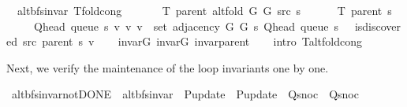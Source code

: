 \begin{isabellebody}
\isamarkupfalse%
\ {\isacharparenleft}{\kern0pt}\ alt{\isacharunderscore}{\kern0pt}bfs{\isacharunderscore}{\kern0pt}invar{\isacharparenright}{\kern0pt}\ T{\isacharunderscore}{\kern0pt}fold{\isacharunderscore}{\kern0pt}cong{\isacharcolon}{\kern0pt}\isanewline
\ \ \isanewline
\ \ \ \ {\isachardoublequoteopen}T\ {\isacharparenleft}{\kern0pt}parent\ {\isacharparenleft}{\kern0pt}alt{\isacharunderscore}{\kern0pt}fold\ G{}\ G{}\ src\ s{\isacharparenright}{\kern0pt}{\isacharparenright}{\kern0pt}\ {\isacharequal}{\kern0pt}\isanewline
\ \ \ \ \ T\ {\isacharparenleft}{\kern0pt}parent\ s{\isacharparenright}{\kern0pt}\ {\isasymunion}\isanewline
\ \ \ \ \ {\isacharbraceleft}{\kern0pt}{\isacharparenleft}{\kern0pt}Q{\isacharunderscore}{\kern0pt}head\ {\isacharparenleft}{\kern0pt}queue\ s{\isacharparenright}{\kern0pt}{\isacharcomma}{\kern0pt}\ v{\isacharparenright}{\kern0pt}\ {\isacharbar}{\kern0pt}v{\isachardot}{\kern0pt}\ v\ {\isasymin}\ set\ {\isacharparenleft}{\kern0pt}adjacency\ G{}\ G{}\ s\ {\isacharparenleft}{\kern0pt}Q{\isacharunderscore}{\kern0pt}head\ {\isacharparenleft}{\kern0pt}queue\ s{\isacharparenright}{\kern0pt}{\isacharparenright}{\kern0pt}{\isacharparenright}{\kern0pt}\ {\isasymand}\ {\isasymnot}\ is{\isacharunderscore}{\kern0pt}discovered\ src\ {\isacharparenleft}{\kern0pt}parent\ s{\isacharparenright}{\kern0pt}\ v{\isacharbraceright}{\kern0pt}{\isachardoublequoteclose}\isanewline
%
\isadelimproof
\ \ %
\endisadelimproof
%
\isatagproof
{}\isamarkupfalse%
\ invar{\isacharunderscore}{\kern0pt}G{}\ invar{\isacharunderscore}{\kern0pt}G{}\ invar{\isacharunderscore}{\kern0pt}parent\isanewline
\ \ \isamarkupfalse%
\ {\isacharparenleft}{\kern0pt}intro\ T{\isacharunderscore}{\kern0pt}alt{\isacharunderscore}{\kern0pt}fold{\isacharunderscore}{\kern0pt}cong{\isacharparenright}{\kern0pt}%
\endisatagproof
{\isafoldproof}%
%
\isadelimproof
%
\endisadelimproof
%
\begin{isamarkuptext}%
Next, we verify the maintenance of the loop invariants one by one.%
\end{isamarkuptext}\isamarkuptrue%
\isamarkupfalse%
\ alt{\isacharunderscore}{\kern0pt}bfs{\isacharunderscore}{\kern0pt}invar{\isacharunderscore}{\kern0pt}not{\isacharunderscore}{\kern0pt}DONE\ {\isacharequal}{\kern0pt}\ alt{\isacharunderscore}{\kern0pt}bfs{\isacharunderscore}{\kern0pt}invar\ \ P{\isacharunderscore}{\kern0pt}update\ {\isacharequal}{\kern0pt}\ P{\isacharunderscore}{\kern0pt}update\ \ Q{\isacharunderscore}{\kern0pt}snoc\ {\isacharequal}{\kern0pt}\ Q{\isacharunderscore}{\kern0pt}snoc\ \isanewline

\end{isabellebody}
